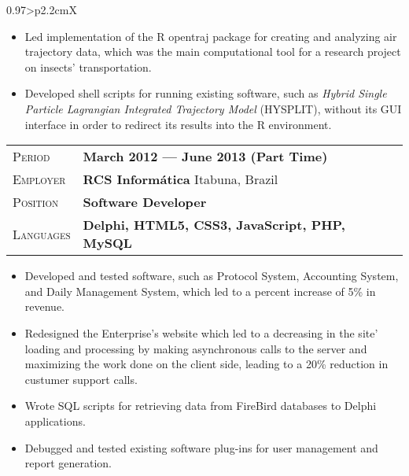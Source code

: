 \documentclass[a4paper, oneside, final]{scrartcl} %
\newcommand{\gray}{\rowcolor[gray]{.90}} %
\begin{document}
\begin{center}
\begin{tabularx}{0.97\linewidth}{>{\raggedleft\scshape}p{2.2cm}X}
\end{tabularx}

\begin{itemize}

\item Led implementation of the R opentraj package for creating and analyzing air trajectory data, which was the main computational tool for a research project on insects' transportation.\\

\item Developed shell scripts for running existing software, such as \textit{Hybrid Single Particle Lagrangian Integrated Trajectory Model} (HYSPLIT), without its GUI interface in order to redirect its results into the R environment.

\end{itemize}

\vspace{12pt}

\begin{tabularx}{0.97\linewidth}{>{\raggedleft\scshape}p{2.2cm}X}
\gray Period & \textbf{March 2012 --- June 2013 (Part Time)}\\
\gray Employer & \textbf{RCS Informática} \hfill Itabuna, Brazil\\
\gray Position & \textbf{Software Developer}\\
\gray Languages & \textbf{Delphi, HTML5, CSS3, JavaScript, PHP, MySQL}\\

\end{tabularx}

\begin{itemize}
\item Developed and tested software, such as Protocol System, Accounting System, and Daily Management System, which led to a percent increase of 5\% in revenue.\\

\item Redesigned the Enterprise's website which led to a decreasing in the site' loading and processing by making asynchronous calls to the server and maximizing the work done on the client side, leading to a 20\% reduction in custumer support calls.\\

\item Wrote SQL scripts for retrieving data from FireBird databases to Delphi applications.\\

\item Debugged and tested existing software plug-ins for user management and report generation.


\end{itemize}
\end{center}
\end{document}
